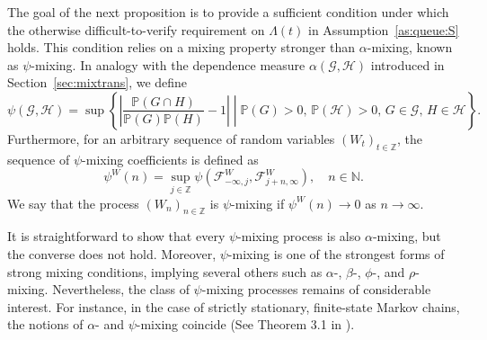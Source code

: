\documentclass[a4paper,10pt]{article}
\newcommand{\N}{\mathbb{N}}
\newcommand{\Z}{\mathbb{Z}}
\newcommand{\F}{\mathcal{F}}
\newcommand{\G}{\mathcal{G}}
\newcommand{\HH}{\mathcal{H}}
\renewcommand{\P}{\mathbb{P}}
\begin{document}
The goal of the next proposition is to provide a sufficient condition under which the otherwise difficult-to-verify requirement on $\Lambda(t)$ in Assumption~\ref{as:queue:S} holds. This condition relies on a mixing property stronger than $\alpha$-mixing, known as $\psi$-mixing. In analogy with the dependence measure $\alpha(\mathcal{G},\mathcal{H})$ introduced in Section~\ref{sec:mixtrans}, we define
\begin{equation}\label{eq:dep_psi}
	\psi (\G,\HH) = \sup \left\{
	\left|\frac{\P (G\cap H)}{\P (G) \P (H)} -1\right|\middle|
	\P (G)>0,\,\P(\HH)>0,\,G\in\G,\,H\in\HH
	\right\}.
\end{equation}
Furthermore, for an arbitrary sequence of random variables $(W_t)_{t\in\Z}$, 
the sequence of $\psi$-mixing coefficients is defined as
$$
\psi^W (n)=\sup_{j\in\Z}\psi (\F_{-\infty,j}^W,\F_{j+n,\infty}^W),
\quad n\in\N.
$$ 
We say that the process $(W_n)_{n\in\Z}$ is $\psi$-mixing if $\psi^W(n)\to 0$ as $n\to\infty$.

It is straightforward to show that every $\psi$-mixing process is also $\alpha$-mixing, but the converse does not hold. Moreover, $\psi$-mixing is one of the strongest forms of strong mixing conditions, implying several others such as $\alpha$-, $\beta$-, $\phi$-, and $\rho$-mixing. Nevertheless, the class of $\psi$-mixing processes remains of considerable interest. For instance, in the case of strictly stationary, finite-state Markov chains, the notions of $\alpha$- and $\psi$-mixing coincide (See Theorem 3.1 in \cite{Bradley2005}).
\end{document}
